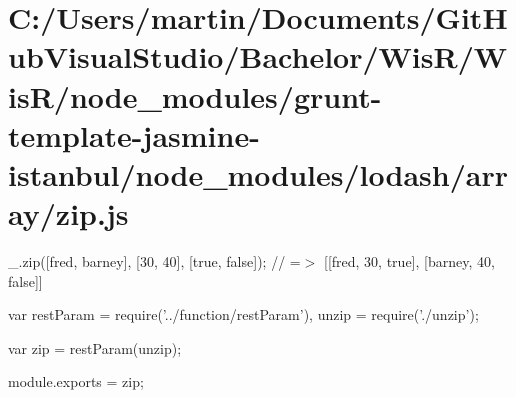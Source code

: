\hypertarget{_c_1_2_users_2martin_2_documents_2_git_hub_visual_studio_2_bachelor_2_wis_r_2_wis_r_2node_modulefc81b79eaf04ebbd0dcb8732b5030b46}{}\section{C\+:/\+Users/martin/\+Documents/\+Git\+Hub\+Visual\+Studio/\+Bachelor/\+Wis\+R/\+Wis\+R/node\+\_\+modules/grunt-\/template-\/jasmine-\/istanbul/node\+\_\+modules/lodash/array/zip.\+js}
\+\_\+.\+zip(\mbox{[}\textquotesingle{}fred\textquotesingle{}, \textquotesingle{}barney\textquotesingle{}\mbox{]}, \mbox{[}30, 40\mbox{]}, \mbox{[}true, false\mbox{]}); // =$>$ \mbox{[}\mbox{[}\textquotesingle{}fred\textquotesingle{}, 30, true\mbox{]}, \mbox{[}\textquotesingle{}barney\textquotesingle{}, 40, false\mbox{]}\mbox{]}


\begin{DoxyCodeInclude}
var restParam = require(\textcolor{stringliteral}{'../function/restParam'}),
    unzip = require(\textcolor{stringliteral}{'./unzip'});

var zip = restParam(unzip);

module.exports = zip;
\end{DoxyCodeInclude}
 